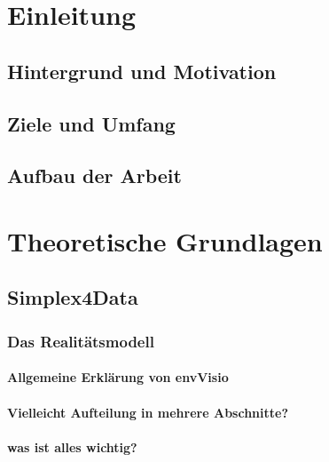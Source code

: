 \documentclass[oneside,a4paper,11pt,openright]{report}
\begin{document}

\cleardoublepage

\tableofcontents

\listoffigures

\listoftables

\printacronyms



\chapter{Einleitung}

\section{Hintergrund und Motivation}
\section{Ziele und Umfang}
\section{Aufbau der Arbeit}

\chapter{Theoretische Grundlagen}

\section{Simplex4Data}
\parencite{rudolfUmweltdatenmanagementGeoInspiration2018}
\subsection{Das Realitätsmodell}
\subsubsection{Allgemeine Erklärung von envVisio}
\subsubsection{Vielleicht Aufteilung in mehrere Abschnitte?}
\subsubsection{was ist alles wichtig?}
\end{document}
